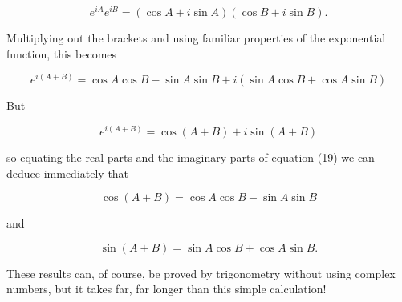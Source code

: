   \begin{equation*}e^{iA} e^{iB} = (\cos A +i \sin A)(\cos B +i \sin B). 
  \tag{18}\end{equation*} 

  Multiplying out the brackets and using familiar properties of the exponential 
  function, this becomes 

  \begin{equation*}e^{i(A+B)} = \cos A \cos B -\sin A \sin B +i(\sin A \cos 
  B+\cos A \sin B) \tag{19}\end{equation*} 

  But 

  \begin{equation*}e^{i(A+B)} = \cos (A+B) + i \sin (A+B) 
  \tag{20}\end{equation*} 

  \noindent{}so equating the real parts and the imaginary parts of equation 
  (19) we can deduce immediately that 

  \begin{equation*}\cos (A+B)= \cos A \cos B -\sin A \sin B 
  \tag{21}\end{equation*} 

  \noindent{}and 

  \begin{equation*}\sin (A+B) = \sin A \cos B+\cos A \sin B . 
  \tag{22}\end{equation*} 

  These results can, of course, be proved by trigonometry without using complex 
  numbers, but it takes far, far longer than this simple calculation! 